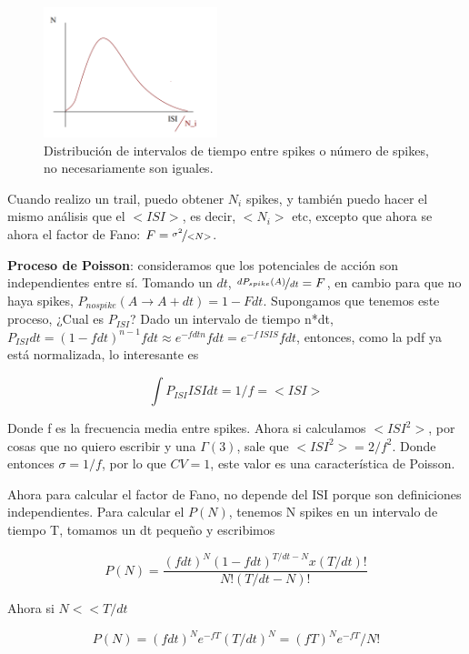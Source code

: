 \begin{figure}[H]
	\centering
	\includegraphics[width=0.45\textwidth]{2-1.png}
	\caption{Distribución de intervalos de tiempo entre spikes o número de spikes, no necesariamente son iguales.}
\end{figure}

Cuando realizo un trail, puedo obtener $N_i$ spikes, y también puedo hacer el mismo análisis que el $<ISI>$, es decir, $<N_i>$ etc, excepto que ahora se ahora el factor de Fano: $F = \nicefrac{\sigma^2}{<N>}$.


{\bf Proceso de Poisson}: consideramos que los potenciales de acción son independientes entre sí. Tomando un $dt$, $\nicefrac{dP_{spike}(A)}{dt} = F$, en cambio para que no haya spikes, $P_{no spike}(A \rightarrow A+dt) = 1 -F dt$. 
Supongamos que tenemos este proceso, ¿Cual es $P_{ISI}$? Dado un intervalo de tiempo n*dt, $P_{ISI}dt=(1-fdt)^{n-1}fdt \approx e^{-fdtn}fdt = e^{-f\,ISIS}fdt$, entonces, como la pdf ya está normalizada, lo interesante es 

\begin{equation}
	\int P_{ISI} ISI dt = 1/f = <ISI>
\end{equation}

Donde f es la frecuencia media entre spikes.  Ahora si calculamos $<ISI^2>$, por cosas que no quiero escribir y una $\Gamma(3)$, sale que $<ISI^2>= 2/f^2$. Donde entonces $\sigma= 1/f$, por lo que $CV=1$, este valor es una característica de Poisson.


Ahora para calcular el factor de Fano, no depende  del ISI porque son definiciones independientes. Para calcular el $P(N)$, tenemos N spikes en un intervalo de tiempo T, tomamos un dt pequeño y escribimos

\begin{equation}
	P(N) = \frac{(fdt)^N (1 - fdt)^{T/dt - N}x (T/dt)!}{N!(T/dt-N)!}
\end{equation}

Ahora si $N<<T/dt$

\begin{equation}
		P(N) = (fdt)^N e^{-fT} (T/dt)^N= (fT)^N e^{-fT}/N!
\end{equation}

